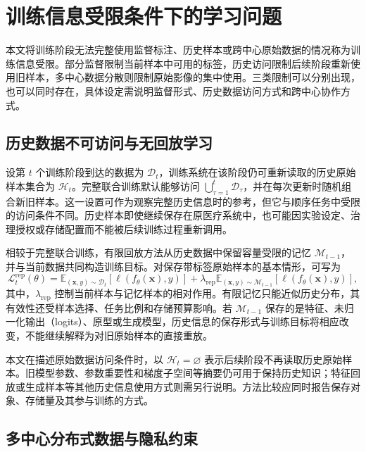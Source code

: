 \section{训练信息受限条件下的学习问题}
\label{sec:foundations-incomplete-data}

本文将训练阶段无法完整使用监督标注、历史样本或跨中心原始数据的情况称为训练信息受限。部分监督限制当前样本中可用的标签，历史访问限制后续阶段重新使用旧样本，多中心数据分散则限制原始影像的集中使用。三类限制可以分别出现，也可以同时存在，具体设定需说明监督形式、历史数据访问方式和跨中心协作方式。

\subsection{历史数据不可访问与无回放学习}
\label{subsec:foundations-replay-free}

设第 $t$ 个训练阶段到达的数据为 $\mathcal{D}_t$，训练系统在该阶段仍可重新读取的历史原始样本集合为 $\mathcal{H}_t$。完整联合训练默认能够访问
$\bigcup_{\tau=1}^{t}\mathcal{D}_{\tau}$，并在每次更新时随机组合新旧样本。这一设置可作为观察完整历史信息时的参考，但它与顺序任务中受限的访问条件不同。历史样本即使继续保存在原医疗系统中，也可能因实验设定、治理授权或存储配置而不能被后续训练过程重新调用。

相较于完整联合训练，有限回放方法从历史数据中保留容量受限的记忆 $\mathcal{M}_{t-1}$，并与当前数据共同构造训练目标。对保存带标签原始样本的基本情形，可写为\cite{method_replay_er,delange2022continual}
\begin{equation}
\mathcal{L}_{t}^{\mathrm{rep}}(\theta)
=
\mathbb{E}_{(\mathbf{x},y)\sim\mathcal{D}_t}
\!\left[\ell\!\left(f_\theta(\mathbf{x}),y\right)\right]
+
\lambda_{\mathrm{rep}}
\mathbb{E}_{(\mathbf{x},y)\sim\mathcal{M}_{t-1}}
\!\left[\ell\!\left(f_\theta(\mathbf{x}),y\right)\right],
\label{eq:foundations-replay-objective}
\end{equation}
其中，$\lambda_{\mathrm{rep}}$ 控制当前样本与记忆样本的相对作用。有限记忆只能近似历史分布，其有效性还受样本选择、任务比例和存储预算影响。若 $\mathcal{M}_{t-1}$ 保存的是特征、未归一化输出（logits）、原型或生成模型，历史信息的保存形式与训练目标将相应改变，不能继续解释为对旧原始样本的直接重放。

本文在描述原始数据访问条件时，以 $\mathcal{H}_t=\varnothing$ 表示后续阶段不再读取历史原始样本。旧模型参数、参数重要性和梯度子空间等摘要仍可用于保持历史知识；特征回放或生成样本等其他历史信息使用方式则需另行说明。方法比较应同时报告保存对象、存储量及其参与训练的方式。

\subsection{多中心分布式数据与隐私约束}
\label{subsec:foundations-distributed-data}


